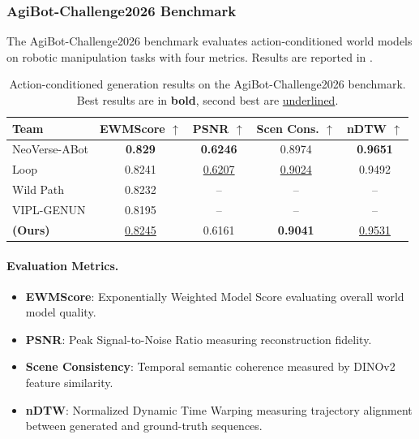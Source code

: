 \subsubsection{AgiBot-Challenge2026 Benchmark}

The AgiBot-Challenge2026 benchmark evaluates action-conditioned world models on robotic manipulation tasks with four metrics. Results are reported in .

\begin{table}[t]
	\centering
	\small
	\caption{Action-conditioned generation results on the AgiBot-Challenge2026 benchmark. Best results are in \textbf{bold}, second best are \underline{underlined}.}
	\label{tab:action-agibot}
	\renewcommand{\arraystretch}{1.15}
	\begin{tabular}{lcccc}
		\toprule
		Team & EWMScore $\uparrow$ & PSNR $\uparrow$ & Scen Cons. $\uparrow$ & nDTW $\uparrow$ \\
		\midrule
		NeoVerse-ABot & \textbf{0.829} & \textbf{0.6246} & 0.8974 & \textbf{0.9651} \\
		Loop & 0.8241 & \underline{0.6207} & \underline{0.9024} & 0.9492 \\
		Wild Path & 0.8232 & -- & -- & -- \\
		VIPL-GENUN & 0.8195 & -- & -- & -- \\
		\textbf{\methodname{} (Ours)} & \underline{0.8245} & 0.6161 & \textbf{0.9041} & \underline{0.9531} \\
		\bottomrule
	\end{tabular}
\end{table}

\paragraph{Evaluation Metrics.}
\begin{itemize}[nosep]
	\item \textbf{EWMScore}: Exponentially Weighted Model Score evaluating overall world model quality.
	\item \textbf{PSNR}: Peak Signal-to-Noise Ratio measuring reconstruction fidelity.
	\item \textbf{Scene Consistency}: Temporal semantic coherence measured by DINOv2 feature similarity.
	\item \textbf{nDTW}: Normalized Dynamic Time Warping measuring trajectory alignment between generated and ground-truth sequences.
\end{itemize}

